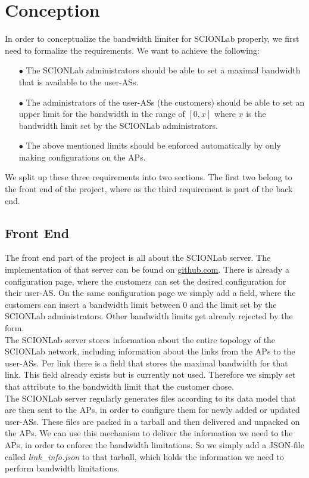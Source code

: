 \chapter{Conception}
In order to conceptualize the bandwidth limiter for \acs{SCIONLab} properly, we first need to formalize the requirements. We want to achieve the following:

\begin{enumerate}
\item[$\bullet$]The \acs{SCIONLab} administrators should be able to set a maximal bandwidth that is available to the user-\acsp{AS}.
\item[$\bullet$]The administrators of the user-\acsp{AS} (the customers) should be able to set an upper limit for the bandwidth in the range of $[0,x]$ where $x$ is the bandwidth limit set by the \acs{SCIONLab} administrators.
\item[$\bullet$] The above mentioned limits should be enforced automatically by only making configurations on the \acsp{AP}.
\end{enumerate}

We split up these three requirements into two sections. The first two belong to the front end of the project, where as the third requirement is part of the back end.

\section{Front End}

The front end part of the project is all about the \acs{SCIONLab} server. The implementation of that server can be found on \href{https://github.com/ManuelMeinen/scionlab/tree/bw-limit}{github.com}\cite{meinen2019scionlab}. There is already a configuration page, where the customers can set the desired configuration for their user-\acs{AS}. On the same configuration page we simply add a field, where the customers can insert a bandwidth limit between 0 and the limit set by the \acs{SCIONLab} administrators. Other bandwidth limits get already rejected by the form.
\\
The \acs{SCIONLab} server stores information about the entire topology of the \acs{SCIONLab} network, including information about the links from the \acsp{AP} to the user-\acsp{AS}. Per link there is a field that stores the maximal bandwidth for that link. This field already exists but is currently not used. Therefore we simply set that attribute to the bandwidth limit that the customer chose.
\\
The \acs{SCIONLab} server regularly generates files according to its data model that are then sent to the \acsp{AP}, in order to configure them for newly added or updated user-\acsp{AS}. These files are packed in a tarball and then delivered and unpacked on the \acsp{AP}. We can use this mechanism to deliver the information we need to the \acsp{AP}, in order to enforce the bandwidth limitations. So we simply add a \ac{JSON}-file called \textit{link\_info.json} to that tarball, which holds the information we need to perform bandwidth limitations.

